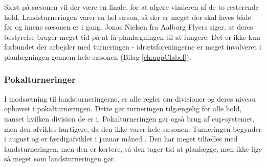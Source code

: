 Sidst på sæsonen vil der være en finale, for at afgøre vinderen af de to resterende hold. Landsturneringen varer en hel sæson, så der er meget der skal laves både før og imens sæsonen er i gang. Jonas Nielsen fra Aalborg Flyers siger, at deres bestyrelse bruger meget tid på at få planlægningen til at fungere. Det er ikke kun forbundet der arbejder med turneringen - idrætsforeningerne er meget involveret i planlægningen gennem hele sæsonen (Bilag \ref{ch:appClabel}). %

\subsubsection{Pokalturneringer}
I modsætning til landsturneringerne, er alle regler om divisioner og deres niveau ophævet i pokalturneringen. Dette gør turneringen tilgængelig for alle hold, uanset hvilken division de er i. Pokalturneringen gør også brug af cup-systemet, men den afvikles hurtigere, da den ikke varer hele sæsonen. Turneringen begynder i august og er færdigafviklet i januar måned \cite{Pokalturnering}. Den har meget tilfælles med landsturneringen, men den er kortere, så den tager tid at planlægge, men ikke lige så meget som landsturneringen gør.

